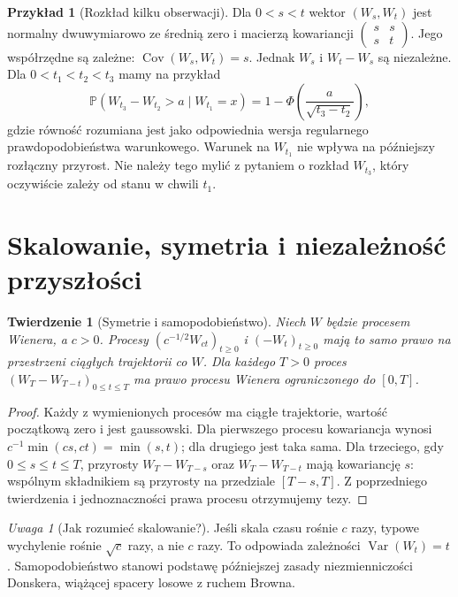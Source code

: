 \documentclass[11pt,a4paper,oneside]{report}
\numberwithin{equation}{chapter}
\theoremstyle{plain}
\newtheorem{twierdzenie}{Twierdzenie}[chapter]
\theoremstyle{definition}
\newtheorem{przyklad}{Przykład}[chapter]
\theoremstyle{remark}
\newtheorem{uwaga}{Uwaga}[chapter]
\newcommand{\Prob}{\mathbb{P}}
\newcommand{\Var}{\operatorname{Var}}
\newcommand{\Cov}{\operatorname{Cov}}
\begin{document}
\begin{przyklad}[Rozkład kilku obserwacji]
Dla $0<s<t$ wektor $(W_s,W_t)$ jest normalny dwuwymiarowo
ze średnią zero i macierzą kowariancji
$\left(\begin{smallmatrix}s&s\\s&t\end{smallmatrix}\right)$.
Jego współrzędne są zależne: $\Cov(W_s,W_t)=s$.
Jednak $W_s$ i $W_t-W_s$ są niezależne.
Dla $0<t_1<t_2<t_3$ mamy na przykład
\[
\Prob(W_{t_3}-W_{t_2}>a\mid W_{t_1}=x)
=1-\Phi\left(\frac{a}{\sqrt{t_3-t_2}}\right),
\]
gdzie równość rozumiana jest jako odpowiednia wersja
regularnego prawdopodobieństwa warunkowego.
Warunek na $W_{t_1}$ nie wpływa na późniejszy rozłączny przyrost.
Nie należy tego mylić z pytaniem o rozkład $W_{t_3}$,
który oczywiście zależy od stanu w chwili $t_1$.
\end{przyklad}

\section{Skalowanie, symetria i niezależność przyszłości}
\begin{twierdzenie}[Symetrie i samopodobieństwo]
Niech $W$ będzie procesem Wienera, a $c>0$.
Procesy $(c^{-1/2}W_{ct})_{t\ge0}$ i
$(-W_t)_{t\ge0}$ mają to samo prawo na przestrzeni
ciągłych trajektorii co $W$. Dla każdego $T>0$ proces
$(W_T-W_{T-t})_{0\le t\le T}$ ma prawo procesu Wienera
ograniczonego do $[0,T]$.
\end{twierdzenie}
\begin{proof}
Każdy z wymienionych procesów ma ciągłe trajektorie,
wartość początkową zero i jest gaussowski.
Dla pierwszego procesu kowariancja wynosi
$c^{-1}\min(cs,ct)=\min(s,t)$; dla drugiego
jest taka sama. Dla trzeciego, gdy $0\le s\le t\le T$,
przyrosty $W_T-W_{T-s}$ oraz $W_T-W_{T-t}$ mają
kowariancję $s$: wspólnym składnikiem są przyrosty
na przedziale $[T-s,T]$. Z poprzedniego twierdzenia
i jednoznaczności prawa procesu otrzymujemy tezy.
\end{proof}

\begin{uwaga}[Jak rozumieć skalowanie?]
Jeśli skala czasu rośnie $c$ razy, typowe wychylenie
rośnie $\sqrt c$ razy, a nie $c$ razy.
To odpowiada zależności $\Var(W_t)=t$.
Samopodobieństwo stanowi podstawę późniejszej zasady
niezmienniczości Donskera, wiążącej spacery losowe z
ruchem Browna.
\end{uwaga}
\end{document}

